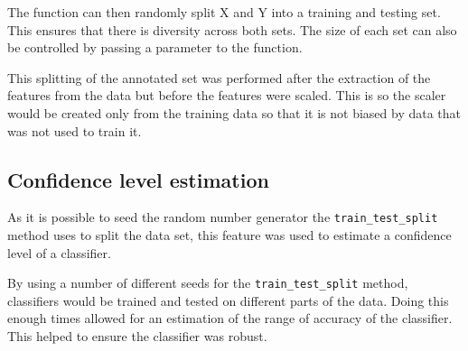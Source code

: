 The function can then randomly split X and Y into a training and testing set. This ensures that there is diversity across both sets. The size of each set can also be controlled by passing a parameter to the function. 

This splitting of the annotated set was performed after the extraction of the features from the data but before the features were scaled. This is so the scaler would be created only from the training data so that it is not biased by data that was not used to train it. 

\subsection{Confidence level estimation}
As it is possible to seed the random number generator the \texttt{train\_test\_split} method uses to split the data set, this feature was used to estimate a confidence level of a classifier. 

By using a number of different seeds for the \texttt{train\_test\_split} method, classifiers would be trained and tested on different parts of the data. Doing this enough times allowed for an estimation of the range of accuracy of the classifier. This helped to ensure the classifier was robust. 



